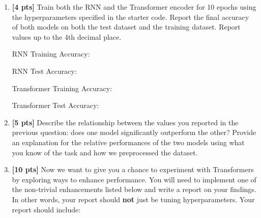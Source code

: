 \begin{enumerate}
    \item \textbf{[4 pts]} Train both the RNN and the Transformer encoder for 10 epochs using the hyperparameters specified in the starter code. Report the final accuracy of both models on both the test dataset and the training dataset. Report values up to the 4th decimal place. 
    
    \begin{tcolorbox}[fit,height=1.5cm, width=8cm, blank, borderline={1pt}{-2pt}]
        RNN Training Accuracy: \ans{}
    \end{tcolorbox}
    \begin{tcolorbox}[fit,height=1.5cm, width=8cm, blank, borderline={1pt}{-2pt}]
        RNN Test Accuracy: \ans{}
    \end{tcolorbox}
    \begin{tcolorbox}[fit,height=1.5cm, width=8cm, blank, borderline={1pt}{-2pt}]
        Transformer Training Accuracy: \ans{}
    \end{tcolorbox}
    \begin{tcolorbox}[fit,height=1.5cm, width=8cm, blank, borderline={1pt}{-2pt}]
        Transformer Test Accuracy: \ans{}
    \end{tcolorbox}
    
    \item \textbf{[5 pts]} Describe the relationship between the values you reported in the previous question: does one model significantly outperform the other? Provide an explanation for the relative performances of the two models using what you know of the task and how we preprocessed the dataset.
    \begin{tcolorbox}[fit,height=6cm, width=15cm, blank, borderline={1pt}{-2pt}]
\begin{answer}

\end{answer}
    \end{tcolorbox}

    \clearpage

    \clearpage
    
    \item \textbf{[10 pts]} Now we want to give you a chance to experiment with Transformers by exploring ways to enhance performance. You will need to implement one of the non-trivial enhancements listed below and write a report on your findings. In other words, your report should \textbf{not} just be tuning hyperparameters. Your report should include: 


\end{enumerate}
